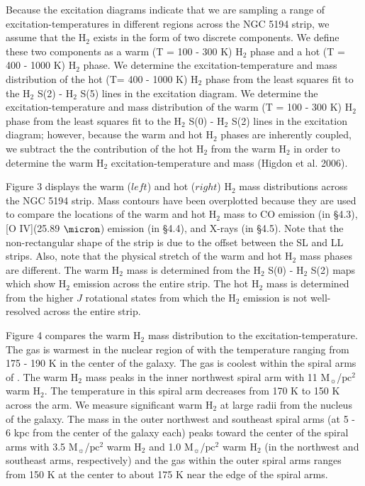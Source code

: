 \documentclass[manuscript]{aastex}
\begin{document}
Because the excitation diagrams indicate that we are sampling a range of excitation-temperatures in different regions across the NGC 5194 strip, we assume that the $\mathrm{H_2}$ exists in the form of two discrete components.  We define these two components as a warm (T = 100 - 300 K) $\mathrm{H_2}$ phase and a hot (T = 400 - 1000 K) $\mathrm{H_2}$ phase.  We determine the excitation-temperature and mass distribution of the hot  (T= 400 - 1000 K) $\mathrm{H_2}$ phase from the least squares fit to the $\mathrm{H_2}$ S(2) - $\mathrm{H_2}$ S(5) lines in the excitation diagram.  We determine the excitation-temperature and mass distribution of the warm (T = 100 - 300 K) $\mathrm{H_2}$ phase from the least squares fit to the $\mathrm{H_2}$ S(0) - $\mathrm{H_2}$ S(2) lines in the excitation diagram; however, because the warm and hot $\mathrm{H_2}$ phases are inherently coupled, we subtract the the contribution of the hot $\mathrm{H_2}$ from the warm $\mathrm{H_2}$ in order to determine the warm $\mathrm{H_2}$ excitation-temperature and mass (Higdon et al. 2006).


Figure 3 displays the warm ($left$) and hot ($right$) $\mathrm{H_2}$ mass distributions across the NGC 5194 strip.  Mass contours have been overplotted because they are used to compare the locations of the warm and hot $\mathrm{H_2}$ mass to CO emission (in \S4.3), [O IV](25.89 $\micron$) emission (in \S4.4), and X-rays (in \S4.5).  Note that the non-rectangular shape of the strip is due to the offset between the SL and LL strips.  Also, note that the physical stretch of the warm and hot $\mathrm{H_2}$ mass phases are different.  The warm $\mathrm{H_2}$ mass is determined from the $\mathrm{H_2}$ S(0) - $\mathrm{H_2}$ S(2) maps which show $\mathrm{H_2}$ emission across the entire strip.  The hot $\mathrm{H_2}$ mass is determined from the higher $J$ rotational states from which the $\mathrm{H_2}$ emission is not well-resolved across the entire strip.

Figure 4 compares the warm $\mathrm{H_2}$ mass distribution to the excitation-temperature.  The gas is warmest in the nuclear region of  with the temperature ranging from 175 - 190 K in the center of the galaxy.  The gas is coolest within the spiral arms of .  The warm $\mathrm{H_2}$ mass peaks in the inner northwest spiral arm with 11 $\mathrm{M_\sun}$/$\mathrm{pc^2}$ warm $\mathrm{H_2}$.  The temperature in this spiral arm decreases from 170 K to 150 K across the arm.  We measure significant warm $\mathrm{H_2}$ at large radii from the nucleus of the galaxy. The mass in the outer northwest and southeast spiral arms (at 5 - 6 kpc from the center of the galaxy each) peaks toward the center of the spiral arms with 3.5 $\mathrm{M_\sun}$/$\mathrm{pc^2}$ warm $\mathrm{H_2}$ and 1.0 $\mathrm{M_\sun}$/$\mathrm{pc^2}$ warm $\mathrm{H_2}$ (in the northwest and southeast arms, respectively) and the gas within the outer spiral arms ranges from 150 K at the center to about 175 K near the edge of the spiral arms.  
\end{document}
